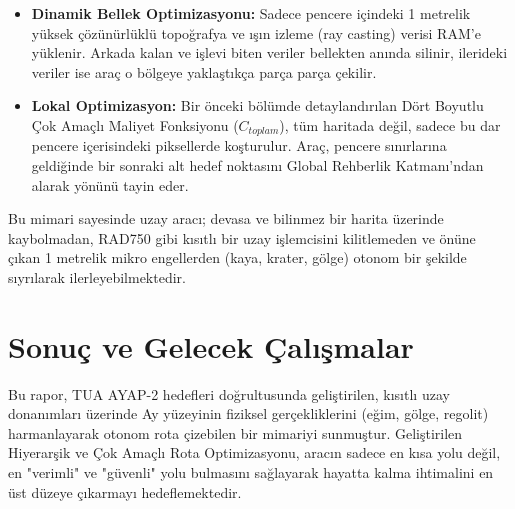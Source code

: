 \documentclass[12pt,a4paper]{article}
\begin{document}
\begin{itemize}
    \item \textbf{Dinamik Bellek Optimizasyonu:} Sadece pencere içindeki 1 metrelik yüksek çözünürlüklü topoğrafya ve ışın izleme (ray casting) verisi RAM’e yüklenir. Arkada kalan ve işlevi biten veriler bellekten anında silinir, ilerideki veriler ise araç o bölgeye yaklaştıkça parça parça çekilir.
    \item \textbf{Lokal Optimizasyon:} Bir önceki bölümde detaylandırılan Dört Boyutlu Çok Amaçlı Maliyet Fonksiyonu ($C_{toplam}$), tüm haritada değil, sadece bu dar pencere içerisindeki piksellerde koşturulur. Araç, pencere sınırlarına geldiğinde bir sonraki alt hedef noktasını Global Rehberlik Katmanı’ndan alarak yönünü tayin eder.
\end{itemize}
Bu mimari sayesinde uzay aracı; devasa ve bilinmez bir harita üzerinde kaybolmadan, RAD750 gibi kısıtlı bir uzay işlemcisini kilitlemeden ve önüne çıkan 1 metrelik mikro engellerden (kaya, krater, gölge) otonom bir şekilde sıyrılarak ilerleyebilmektedir.

\section{Sonuç ve Gelecek Çalışmalar}
Bu rapor, TUA AYAP-2 hedefleri doğrultusunda geliştirilen, kısıtlı uzay donanımları üzerinde Ay yüzeyinin fiziksel gerçekliklerini (eğim, gölge, regolit) harmanlayarak otonom rota çizebilen bir mimariyi sunmuştur. Geliştirilen Hiyerarşik ve Çok Amaçlı Rota Optimizasyonu, aracın sadece en kısa yolu değil, en "verimli" ve "güvenli" yolu bulmasını sağlayarak hayatta kalma ihtimalini en üst düzeye çıkarmayı hedeflemektedir.
\end{document}
